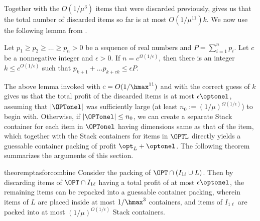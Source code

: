 Together with the $O(1/\mu^3)$ items that were discarded previously,  gives us that the total number of discarded items so far is at most $O(1/\mu^{11})k$. We now use the following lemma from \cite{jansen1999improved}.
\begin{lemma}
    Let $p_1\ge p_2\ge \ldots \ge p_n>0$ be a sequence of real numbers and $P=\sum_{i=1}^{n} p_i$. Let $c$ be a nonnegative integer and $\epsilon >0$. If $n = c^{\Omega(1/\epsilon)}$, then there is an integer $k \le c^{O(1/\epsilon)}$ such that $p_{k+1}+\ldots p_{k+ck} \le \epsilon P$.
    
\end{lemma}


The above lemma invoked with $c=O(1/\hmax^{11})$ and with the correct guess of $k$ gives us that the total profit of the discarded items is at most $\epsilon \optonel$, assuming that $|\OPTonel|$ was sufficiently large (at least $n_0 := (1/\mu)^{\Omega(1/\epsilon)}$) to begin with. Otherwise, if $|\OPTonel| \le n_0$, we can create a separate Stack container for each item in $\OPTonel$ having dimensions same as that of the item, which together with the Stack containers for items in $\OPTL$ directly yields a guessable container packing of profit $\opt_L + \optonel$. The following theorem summarizes the arguments of this section.

\begin{restatable}{theorem}{ptasforcombine}
    Consider the packing of $\OPT\cap (I_{1\ell}\cup L)$.
    Then by discarding items of $\OPT\cap I_{1\ell}$ having a total profit of at most $\epsilon\optonel$, the remaining items can be repacked into a guessable container packing, wherein items of $L$ are placed inside at most $1/\hmax^3$  containers, and items of $I_{1\ell}$ are packed into at most $(1/\mu)^{O(1/\epsilon)}$ Stack containers.
\end{restatable}




